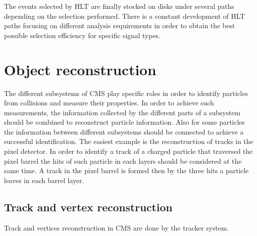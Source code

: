 The events selected by HLT are finally stocked on disks under several paths depending on the selection performed. There is a constant development of HLT paths focusing on different analysis requirements in order to obtain the best possible selection efficiency for specific signal types. 

\section{Object reconstruction}

The different subsystems of CMS play specific roles in order to identify particles from collisions and measure their properties. In order to achieve such measurements, the information collected by the different parts of a subsystem should be combined to reconstruct particle information. Also for some particles the information between different subsystems should be connected to achieve a successful identification. The easiest example is the reconstruction of tracks in the pixel detector. In order to identify a track of a charged particle that traversed the pixel barrel the hits of such particle in each layers should be considered at the same time. A track in the pixel barrel is formed then by the three hits a particle leaves in each barrel layer.

\subsection{Track and vertex reconstruction}

Track and vertices reconstruction in CMS are done by the tracker system. 

